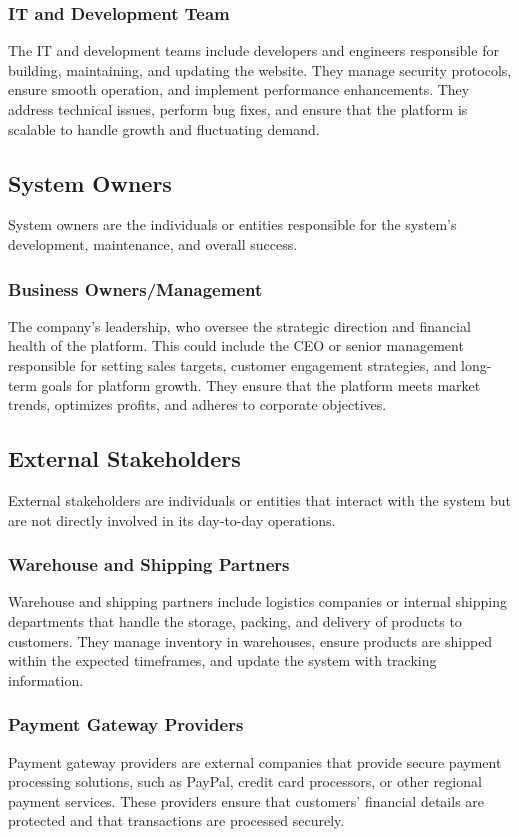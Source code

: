 \documentclass[twoside,a4paper,journal]{IEEEtran}
\begin{document}
\subsubsection{IT and Development Team}
The IT and development teams include
developers and engineers responsible for building, maintaining, and updating the
website.
They manage security protocols, ensure smooth operation, and implement
performance enhancements. They address technical issues, perform bug fixes,
and ensure that the platform is scalable to handle growth and fluctuating
demand.

\subsection{System Owners}
System owners are the individuals or entities responsible for the system's
development, maintenance, and overall success.

\subsubsection{Business Owners/Management}
The company's leadership, who oversee the strategic direction and financial
health of the platform.
This could include the CEO or senior management
responsible for setting sales targets, customer engagement strategies, and
long-term goals for platform growth.
They ensure that the platform meets market
trends, optimizes profits, and adheres to corporate objectives.

\subsection{External Stakeholders}
External stakeholders are individuals or entities that interact with the system
but are not directly involved in its day-to-day operations.

\subsubsection{Warehouse and Shipping Partners}
Warehouse and shipping partners include logistics companies or internal shipping
departments that handle the storage, packing, and delivery of products to
customers.
They manage inventory in warehouses, ensure products are shipped within the
expected timeframes, and update the system with tracking information.

\subsubsection{Payment Gateway Providers}
Payment gateway providers are external companies that provide secure payment
processing solutions, such as PayPal, credit card processors, or other regional
payment services.
These providers ensure that customers' financial details are protected and that
transactions are processed securely.
\end{document}
